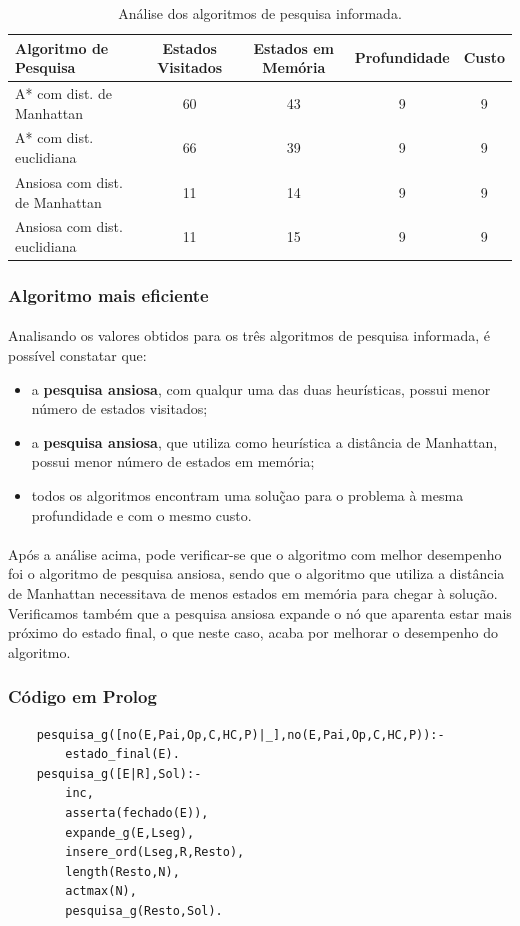 \documentclass{article}
\begin{document}
\begin{table}[H]
\centering
\begin{tabular}{l|c|c|c|c}
Algoritmo de Pesquisa & Estados Visitados & Estados em Memória & Profundidade & Custo \\\hline
A* com dist. de Manhattan & 60 & 43 & 9 & 9 \\\hline
A* com dist. euclidiana & 66 & 39 & 9 & 9 \\\hline
Ansiosa com dist. de Manhattan & 11 & 14 & 9 & 9 \\\hline
Ansiosa com dist. euclidiana & 11 & 15 & 9 & 9 
\end{tabular}
\caption{\label{tab:pni}Análise dos algoritmos de pesquisa informada.}
\end{table}

\subsubsection{Algoritmo mais eficiente}
\paragraph{} Analisando os valores obtidos para os três algoritmos de pesquisa informada, é possível constatar que:
\begin{itemize}
  \item a \textbf{pesquisa ansiosa}, com qualqur uma das duas heurísticas, possui menor número de estados visitados;
  \item a \textbf{pesquisa ansiosa}, que utiliza como heurística a distância de Manhattan, possui menor número de estados em memória;
  \item todos os algoritmos encontram uma soluç̃ao para o problema à mesma profundidade e com o mesmo custo.
\end{itemize}

\paragraph{} Após a análise acima, pode verificar-se que o algoritmo com melhor desempenho foi o algoritmo de pesquisa ansiosa, sendo que o algoritmo que utiliza a distância de Manhattan necessitava de menos estados em memória para chegar à solução. Verificamos também que a pesquisa ansiosa expande o nó que aparenta estar mais próximo do estado final, o que neste caso, acaba por melhorar o desempenho do algoritmo.

\subsubsection{Código em Prolog}
\begin{verbatim}
    pesquisa_g([no(E,Pai,Op,C,HC,P)|_],no(E,Pai,Op,C,HC,P)):-
        estado_final(E).
    pesquisa_g([E|R],Sol):- 
        inc, 
        asserta(fechado(E)), 
        expande_g(E,Lseg),
        insere_ord(Lseg,R,Resto),
        length(Resto,N),
        actmax(N),
        pesquisa_g(Resto,Sol).
\end{verbatim}
\end{document}
